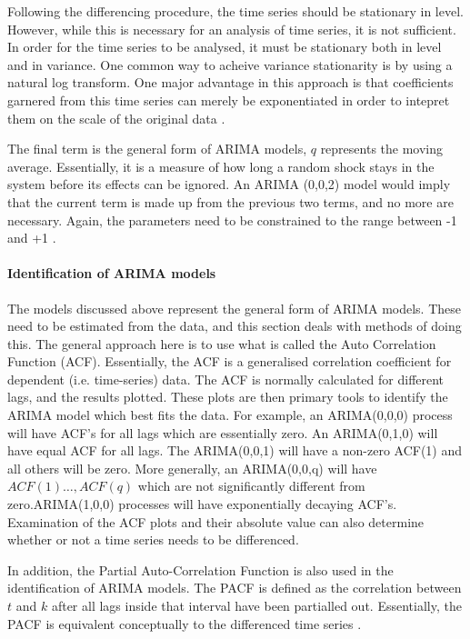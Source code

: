 Following the differencing procedure, the time series should be stationary in level. However, while this is necessary for an analysis of time series, it is not sufficient. In order for the time series to be analysed, it must be stationary both in level and in variance. One common way to acheive variance stationarity is by using a natural log transform. One major advantage in this approach is that coefficients garnered from this time series can merely be exponentiated in order to intepret them on the scale of the original data \cite{gelman2007data}.  


The final term is the general form of ARIMA models, $q$ represents the moving average. Essentially, it is a measure of how long a random shock stays in the system before its effects can be ignored. An ARIMA (0,0,2) model would imply that the current term is made up from the previous two terms, and no more are necessary. Again, the parameters need to be constrained to the range between -1 and +1 \cite{mccleary1980applied}.


\paragraph{Identification of ARIMA models}

The models discussed above represent the general form of ARIMA models. These need to be estimated from the data, and this section deals with  methods of doing this. The general approach here is to use what is called the Auto Correlation Function (ACF)\cite{mccleary1980applied}. Essentially, the ACF is a generalised correlation coefficient for dependent (i.e. time-series) data. The ACF is normally calculated for different lags, and the results plotted. These plots are then primary tools to identify the ARIMA model which best fits the data. For example, an ARIMA(0,0,0) process will have ACF's for all lags which are essentially zero. An ARIMA(0,1,0) will have equal ACF for all lags. The ARIMA(0,0,1) will have a non-zero ACF(1) and all others will be zero. More generally, an ARIMA(0,0,q) will have $ACF(1)\ldots, ACF(q)$ which are not significantly different from  zero.ARIMA(1,0,0) processes will have exponentially decaying ACF's. Examination of the ACF plots and their absolute value can also determine whether or not a time series needs to be differenced.

In addition, the Partial Auto-Correlation Function is also used in the identification of ARIMA models. The PACF is defined as the correlation between $t$ and $k$ after all lags inside that interval have been partialled out. Essentially, the PACF is equivalent conceptually to the differenced time series \cite{mccleary1980applied}.

